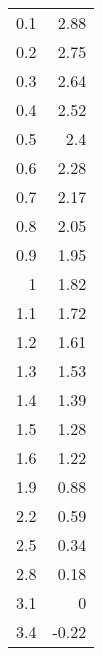 \begin{tabular}{rr}
\hline
 0.1 &  2.88 \\
 0.2 &  2.75 \\
 0.3 &  2.64 \\
 0.4 &  2.52 \\
 0.5 &  2.4  \\
 0.6 &  2.28 \\
 0.7 &  2.17 \\
 0.8 &  2.05 \\
 0.9 &  1.95 \\
 1   &  1.82 \\
 1.1 &  1.72 \\
 1.2 &  1.61 \\
 1.3 &  1.53 \\
 1.4 &  1.39 \\
 1.5 &  1.28 \\
 1.6 &  1.22 \\
 1.9 &  0.88 \\
 2.2 &  0.59 \\
 2.5 &  0.34 \\
 2.8 &  0.18 \\
 3.1 &  0    \\
 3.4 & -0.22 \\
\hline
\end{tabular}